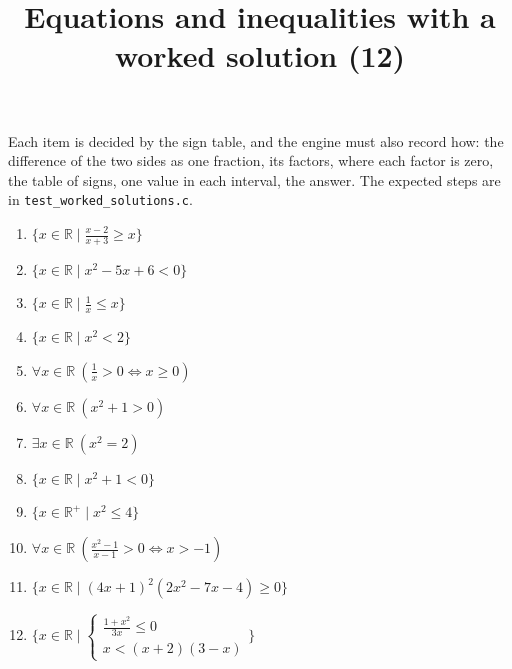 \documentclass[11pt,a4paper]{article}
\title{Equations and inequalities with a worked solution (12)}
\author{}
\date{}
\begin{document}
\maketitle
Each item is decided by the sign table, and the engine must also record how: the difference of the two sides as one fraction, its factors, where each factor is zero, the table of signs, one value in each interval, the answer. The expected steps are in \texttt{test\_worked\_solutions.c}.

\begin{enumerate}
\item $\displaystyle \{x \in \mathbb{R} \mid \frac{x - 2}{x + 3} \ge x\}$
\item $\displaystyle \{x \in \mathbb{R} \mid x^{2} - 5x + 6 < 0\}$
\item $\displaystyle \{x \in \mathbb{R} \mid \frac{1}{x} \le x\}$
\item $\displaystyle \{x \in \mathbb{R} \mid x^{2} < 2\}$
\item $\displaystyle \forall x \in \mathbb{R}\ \left(\frac{1}{x} > 0 \iff x \ge 0\right)$
\item $\displaystyle \forall x \in \mathbb{R}\ (x^{2} + 1 > 0)$
\item $\displaystyle \exists x \in \mathbb{R}\ (x^{2} = 2)$
\item $\displaystyle \{x \in \mathbb{R} \mid x^{2} + 1 < 0\}$
\item $\displaystyle \{x \in \mathbb{R}^{+} \mid x^{2} \le 4\}$
\item $\displaystyle \forall x \in \mathbb{R}\ \left(\frac{x^{2} - 1}{x - 1} > 0 \iff x > -1\right)$
\item $\displaystyle \{x \in \mathbb{R} \mid (4x + 1)^{2}(2x^{2} - 7x - 4) \ge 0\}$
\item $\displaystyle \{x \in \mathbb{R} \mid \begin{cases} \frac{1 + x^{2}}{3x} \le 0 \\ x < (x + 2)(3 - x) \end{cases}\}$
\end{enumerate}
\end{document}
